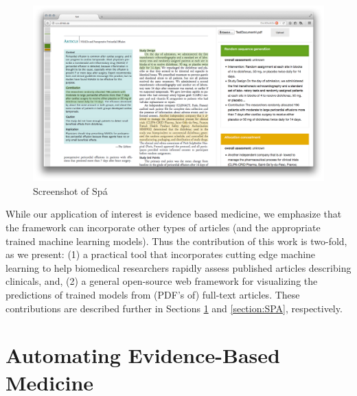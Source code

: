 \documentclass[runningheads,a4paper]{llncs}
\begin{document}
\begin{figure}[htb]
\centering
\includegraphics[width=.9\linewidth]{images/screenshot.png}
\caption{Screenshot of Sp{\'a}}
\end{figure}

While our application of interest is evidence based medicine, we emphasize that the framework can incorporate other types of articles (and the appropriate trained machine learning models). Thus the contribution of this work is two-fold, as we present: (1) a practical tool that incorporates cutting edge machine learning to help biomedical researchers rapidly assess published articles describing clinicals, and, (2) a general open-source web framework for visualizing the predictions of trained models from (PDF's of) full-text articles. These contributions are described further in Sections \ref{section:EBM-ML} and \ref{section:SPA}, respectively.

\section{Automating Evidence-Based Medicine}
\label{section:EBM-ML}



\end{document}
